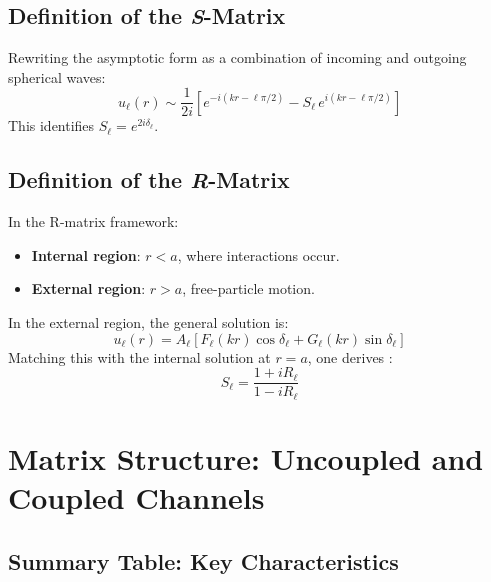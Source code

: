 \documentclass[10pt,a4paper]{article}
\begin{document}
	\subsection{Definition of the \textit{S}-Matrix}
	
	Rewriting the asymptotic form as a combination of incoming and outgoing spherical waves:
	\[
	u_\ell(r) \sim \frac{1}{2i} \left[ e^{-i(kr - \ell\pi/2)} - S_\ell \, e^{i(kr - \ell\pi/2)} \right]
	\]
	This identifies \( S_\ell = e^{2i\delta_\ell} \).
	
	\subsection{Definition of the \textit{R}-Matrix}
	
	In the R-matrix framework:
	\begin{itemize}
		\item \textbf{Internal region}: \( r < a \), where interactions occur.
		\item \textbf{External region}: \( r > a \), free-particle motion.
	\end{itemize}
	
	In the external region, the general solution is:
	\[
	u_\ell(r) = A_\ell \left[ F_\ell(kr) \cos\delta_\ell + G_\ell(kr) \sin\delta_\ell \right]
	\]
	Matching this with the internal solution at \( r = a \), one derives \cite{advances}:
	\[
	S_\ell = \frac{1 + iR_\ell}{1 - iR_\ell}
	\]
	
	\section{Matrix Structure: Uncoupled and Coupled Channels}
	
	\subsection{Summary Table: Key Characteristics}
	
\end{document}
